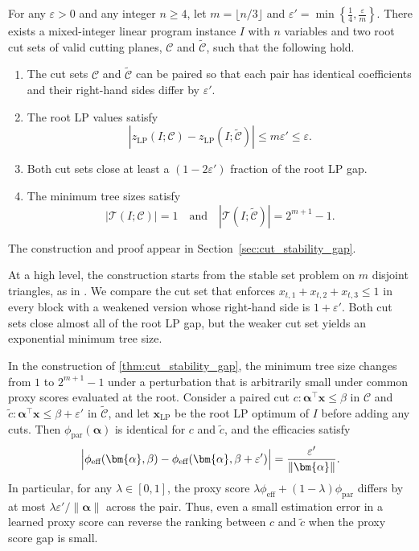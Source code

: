 \documentclass[smallextended,envcountsect]{svjour3} %
\newcommand{\set}[1]{\left\{#1\right\}}
\newcommand{\x}{\mathbf{x}}
\newcommand{\Tcal}{\mathcal{T}}
\newcommand{\Ccal}{\mathcal{C}}
\newcommand{\0}{\mathbf{0}}
\newcommand{\LP}{\mathrm{LP}}
\newcommand{\1}{\mathbf{1}} %
\begin{document}
\begin{theorem} \label{thm:cut_stability_gap}
	For any $\varepsilon > 0$ and any integer $n\ge 4$, let $m=\lfloor n/3\rfloor$ and $\varepsilon'=\min\set{\frac{1}{4},\frac{\varepsilon}{m}}$.
	There exists a mixed-integer linear program instance $I$ with $n$ variables and two root cut sets of valid cutting planes, $\Ccal$ and $\widetilde{\Ccal}$, such that the following hold.
	\begin{enumerate}
		\item The cut sets $\Ccal$ and $\widetilde{\Ccal}$ can be paired so that each pair has identical coefficients and their right-hand sides differ by $\varepsilon'$.
		\item The root LP values satisfy
		\[
				|z_{\LP}(I; \Ccal) - z_{\LP}(I; \widetilde{\Ccal})| \leq m\varepsilon' \leq \varepsilon.
		\]
		\item Both cut sets close at least a $(1 - 2\varepsilon')$ fraction of the root LP gap.
		\item The minimum tree sizes satisfy
		      \[
			      |\Tcal(I;\Ccal)| = 1 \quad \text{and} \quad |\Tcal(I;\widetilde{\Ccal})| = 2^{m+1} - 1.
		      \]
	\end{enumerate}
	\end{theorem}
    The construction and proof appear in Section~\ref{sec:cut_stability_gap}.

	At a high level, the construction starts from the stable set problem on $m$ disjoint triangles, as in \citet[Theorem~2.2]{basu2020complexity}.
	We compare the cut set that enforces $x_{t,1}+x_{t,2}+x_{t,3}\le 1$ in every block with a weakened version whose right-hand side is $1+\varepsilon'$.
	Both cut sets close almost all of the root LP gap, but the weaker cut set yields an exponential minimum tree size.

	\begin{remark}\label{rem:cut_proxy_proximity_gap}
		In the construction of \cref{thm:cut_stability_gap}, the minimum tree size changes from $1$ to $2^{m+1}-1$ under a perturbation that is arbitrarily small under common proxy scores evaluated at the root.
		Consider a paired cut $c:\bm{\alpha}^\top \x \le \beta$ in $\Ccal$ and $\tilde c:\bm{\alpha}^\top \x \le \beta+\varepsilon'$ in $\widetilde{\Ccal}$, and let $\x_{\LP}$ be the root LP optimum of $I$ before adding any cuts.
		Then $\phi_{\text{par}}(\bm{\alpha})$ is identical for $c$ and $\tilde c$, and the efficacies satisfy
		\[
			\Bigl|\phi_{\text{eff}}(\bm{\alpha},\beta)-\phi_{\text{eff}}(\bm{\alpha},\beta+\varepsilon')\Bigr|
			=\frac{\varepsilon'}{\|\bm{\alpha}\|}.
		\]
		In particular, for any $\lambda\in[0,1]$, the proxy score $\lambda\phi_{\text{eff}}+(1-\lambda)\phi_{\text{par}}$ differs by at most $\lambda\varepsilon'/\|\bm{\alpha}\|$ across the pair.
		Thus, even a small estimation error in a learned proxy score can reverse the ranking between $c$ and $\tilde c$ when the proxy score gap is small.
	\end{remark}
\end{document}
